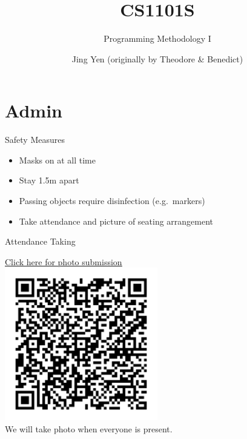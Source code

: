 \documentclass[10pt]{beamer}
\title{CS1101S}
\subtitle{Programming Methodology I}
\date{}
\author{Jing Yen (originally by Theodore \& Benedict)}
\institute{Studio 2 - Tutorial Group 10C}
\begin{document}
\maketitle


\section[Admin Stuff]{Admin}


\begin{frame}{Safety Measures}
\begin{itemize}
  \item Masks on at all time
  \item Stay 1.5m apart
  \item Passing objects require disinfection (e.g.\ markers)
  \item Take attendance and picture of seating arrangement
\end{itemize}
\end{frame}

\begin{frame}[fragile]{Attendance Taking}
\begin{centering}
\href{https://inetapps.nus.edu.sg/ctr/Session/Details/158206}{\underline{Click here for photo submission}} \\
\includegraphics[width=0.5\textwidth]{qrattendancestudio2.png} \\
We will take photo when everyone is present. \\
\end{centering}
\end{frame}
\end{document}
